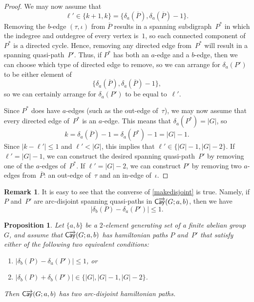 \documentclass[11pt]{amsart}
\newtheorem{prop}[equation]{Proposition}
\theoremstyle{definition}
\newtheorem{remark}[equation]{Remark}
\numberwithin{case}{startcases}
\numberwithin{equation}{section}
\newcommand{\cayd}{\mathop{\mathsf{C}\mkern-1mu\overrightarrow{\mathsf{ay}}}}
\begin{document}
\begin{proof}
		We may now assume that 
		\[ \ell' \in \{ k + 1, k \}
		= \{\delta_a(\overline P), \delta_a(\overline P) - 1\} . \]
		Removing the $b$-edge $(\tau, \iota)$ from $\overline P$ results in a spanning subdigraph~$P^*$ in which the indegree and outdegree of every vertex is~$1$, so each connected component of~$P^*$ is a directed cycle. Hence, removing any directed edge from~$P^*$ will result in a spanning quasi-path~$P'$. Thus, if $P^*$ has both an $a$-edge and a $b$-edge, then we can choose which type of directed edge to remove, so we can arrange for $\delta_a(P')$ to be either element of 
		\[ \{\delta_a(\overline P), \delta_a(\overline P) - 1\} , \]
		so we can certainly arrange for $\delta_a(P')$ to be equal to~$\ell'$.
		
		Since $P^*$ does have $a$-edges (such as the out-edge of~$\tau$), we may now assume that every directed edge of~$P^*$ is an $a$-edge. This means that $\delta_a(P^*) = |G|$, so 
		\[ k = \delta_a(\overline{P}) - 1 
		= \delta_a(P^*) - 1 = |G| - 1 . \]
		Since $|k - \ell'| \le 1$ and $\ell' < |G|$, this implies that $\ell' \in \{ |G| - 1, |G| - 2 \}$. If $\ell' = |G| - 1$, we can construct the desired spanning quasi-path~$P'$ by removing one of the $a$-edges of~$P^*$. If $\ell' = |G| - 2$, we can construct $P'$ by removing two $a$-edges from~$\overline{P}$: an out-edge of~$\tau$ and an in-edge of~$\iota$.
	\end{proof}
	
	\begin{remark} \label{MustBe<1}
		It is easy to see that the converse of \cref{makedisjoint} is true. Namely, if $P$ and~$P'$ are arc-disjoint spanning quasi-paths in $\cayd(G; a,b)$, then we have
		\[ |\delta_b (P) - \delta_a (P')| \le 1 . \]
	\end{remark} 
	
	\begin{prop} \label{iflessthanone}
		Let $\{a,b\}$ be a $2$-element generating set of a finite abelian group~$G$, and assume that $\cayd(G; a,b)$ has hamiltonian paths $P$ and~$P'$ that satisfy either of the following two equivalent conditions:
		\begin{enumerate}
			\item \label{iflessthanone-ba}
			$|\delta_b(P) - \delta_a(P')| \le 1$,
			or
			\item \label{iflessthanone-bb}
			$|\delta_b(P) + \delta_b(P')| \in \{|G|, |G| - 1, |G| - 2\}$.
		\end{enumerate}
		Then $\cayd(G; a,b)$ has two arc-disjoint hamiltonian paths.
	\end{prop}
	
\end{document}
